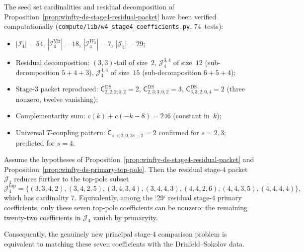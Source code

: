 \begin{computation}
\label{comp:winfty-stage4-seed-verification}
The seed set cardinalities and residual decomposition of
Proposition~\ref{prop:winfty-ds-stage4-residual-packet} have been
verified computationally
(\texttt{compute/\allowbreak lib/\allowbreak w4\_stage4\_coefficients.py},
$74$~tests):
\begin{itemize}
\item $|\mathcal{I}_4| = 54$,
  $|\mathcal{I}_4^{\mathrm{Vir}}| = 18$,
  $|\mathcal{I}_4^{W_3}| = 7$,
  $|\mathcal{J}_4| = 29$;
\item Residual decomposition: $(3,3)$-tail of size~$2$,
  $\mathcal{J}_4^{3,4}$ of size~$12$ (sub-decomposition $5+4+3$),
  $\mathcal{J}_4^{4,4}$ of size~$15$ (sub-decomposition $6+5+4$);
\item Stage-$3$ packet reproduced:
  $\mathsf{C}^{\mathrm{DS}}_{2,2;2;0,2} = 2$,
  $\mathsf{C}^{\mathrm{DS}}_{2,3;3;0,2} = 3$,
  $\mathsf{C}^{\mathrm{DS}}_{3,3;2;0,4} = 2$ (three nonzero,
  twelve vanishing);
\item Complementarity sum:
  $c(k) + c(-k-8) = 246$ (constant in~$k$);
\item Universal $T$-coupling pattern:
  $\mathsf{C}_{s,s;2;0,2s-2} = 2$ confirmed for $s = 2, 3$;
  predicted for $s = 4$.
\end{itemize}
\end{computation}

\begin{corollary}
\label{cor:winfty-ds-stage4-top-pole-packet}
Assume the hypotheses of
Proposition~\ref{prop:winfty-ds-stage4-residual-packet} and
Proposition~\ref{prop:winfty-ds-primary-top-pole}.  Then the residual
stage-$4$ packet $\mathcal{J}_4$ reduces further to the top-pole subset
\[
\mathcal{J}_4^{\mathrm{top}}
=\{(3,3,4,2),(3,4,2,5),(3,4,3,4),(3,4,4,3),
(4,4,2,6),(4,4,3,5),(4,4,4,4)\},
\]
which has cardinality $7$.  Equivalently, among the `29` residual
stage-$4$ primary coefficients, only these seven top-pole coefficients
can be nonzero; the remaining twenty-two coefficients in
$\mathcal{J}_4$ vanish by primaryity.

Consequently, the genuinely new principal stage-$4$ comparison problem
is equivalent to matching these seven coefficients with the
Drinfeld--Sokolov data.
\end{corollary}

